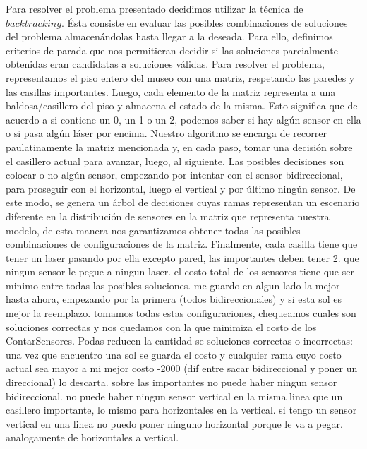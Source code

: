 Para resolver el problema presentado decidimos utilizar la técnica de $backtracking$. Ésta consiste en evaluar las posibles combinaciones de soluciones del problema almacenándolas hasta llegar a la deseada. Para ello, definimos criterios de parada que nos permitieran decidir si las soluciones parcialmente obtenidas eran candidatas a soluciones válidas.\newline
\newline
Para resolver el problema, representamos el piso entero del museo con una matriz, respetando las paredes y las casillas importantes. Luego, cada elemento de la matriz representa a una baldosa/casillero del piso y almacena el estado de la misma. Esto significa que de acuerdo a si contiene un 0, un 1 o un 2, podemos saber si hay algún sensor en ella o si pasa algún láser por encima.\newline
\newline
Nuestro algoritmo se encarga de recorrer paulatinamente la matriz mencionada y, en cada paso, tomar una decisión sobre el casillero actual para avanzar, luego, al siguiente. Las posibles decisiones son colocar o no algún sensor, empezando por intentar con el sensor bidireccional, para proseguir con el horizontal, luego el vertical y por último ningún sensor. De este modo, se genera un árbol de decisiones cuyas ramas representan un escenario diferente en la distribución de sensores en la matriz que representa nuestra modelo, de esta manera nos garantizamos obtener todas las posibles combinaciones de configuraciones de la matriz. Finalmente, cada casilla tiene que tener un laser pasando por ella excepto pared, las importantes deben tener 2. que ningun sensor le pegue a ningun laser. el costo total de los sensores tiene que ser minimo entre todas las posibles soluciones. me guardo en algun lado la mejor hasta ahora, empezando por la primera (todos bidireccionales) y si esta sol es mejor la reemplazo. tomamos todas estas configuraciones, chequeamos cuales son soluciones correctas y nos quedamos con la que minimiza el costo de los ContarSensores.
Podas reducen la cantidad se soluciones correctas o incorrectas: una vez que encuentro una sol se guarda el costo y cualquier rama cuyo costo actual sea mayor a mi mejor costo -2000 (dif entre sacar bidireccional y poner un direccional) lo descarta. sobre las importantes no puede haber ningun sensor bidireccional. no puede haber ningun sensor vertical en la misma linea que un casillero importante, lo mismo para horizontales en la vertical. si tengo un sensor vertical en una linea no puedo poner ninguno horizontal porque le va a pegar. analogamente de horizontales a vertical.
\newline


